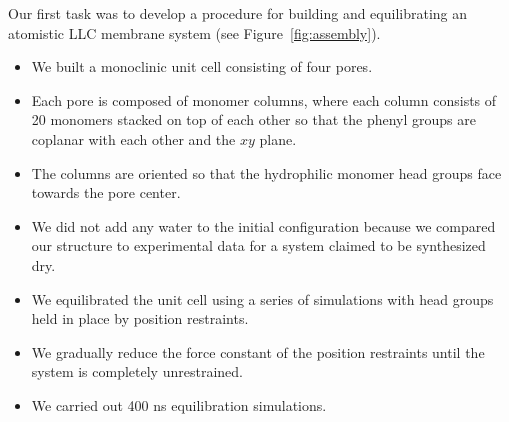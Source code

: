 \documentclass{article}
\begin{document}
  \noindent Our first task was to develop a procedure for building and equilibrating 
  an atomistic LLC membrane system (see Figure~\ref{fig:assembly}).
  \begin{itemize}
    \item We built a monoclinic unit cell consisting of four pores.
    \item Each pore is composed of monomer columns, where each column
    consists of 20 monomers stacked on top of each other so that the 
    phenyl groups are coplanar with each other and the $xy$ plane. 
    \item The columns are oriented so that the hydrophilic monomer head
    groups face towards the pore center.
    \item We did not add any water to the initial configuration because we
    compared our structure to experimental data for a system claimed to be
    synthesized dry.
    \item We equilibrated the unit cell using a series of simulations
    with head groups held in place by position restraints. 
    \item We gradually reduce the force constant of the position 
    restraints until the system is completely unrestrained.
    \item We carried out 400 ns equilibration simulations.

  \end{itemize}
  
\end{document}
